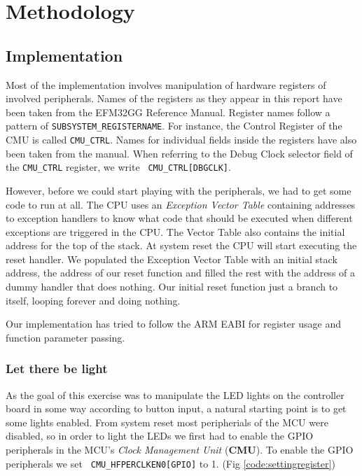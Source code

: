 \chapter{Methodology}

\section{Implementation}

Most of the implementation involves manipulation of hardware registers of
involved peripherals. Names of the registers as they appear in this report have
been taken from the EFM32GG Reference Manual. \cite{EFM32GGManual} Register names
follow a pattern of {\tt SUBSYSTEM\_REGISTERNAME}. For instance, the Control
Register of the CMU is called  {\tt CMU\_CTRL}. Names for individual fields
inside the registers have also been taken from the manual. When referring to the
Debug Clock selector field of the {\tt CMU\_CTRL} register, we write {\tt
CMU\_CTRL[DBGCLK]}.

However, before we could start playing with the peripherals, we had to get some
code to run at all. The CPU uses an \emph{Exception Vector Table} containing
addresses to exception handlers to know what code that should be executed when
different exceptions are triggered in the CPU. \cite{CortexM3Manual} The Vector
Table also contains the initial address for the top of the stack. At system
reset the CPU will start executing the reset handler. We populated the Exception
Vector Table with an initial stack address, the address of our reset function
and filled the rest with the address of a dummy handler that does nothing. Our
initial reset function just a branch to itself, looping forever and doing
nothing.

Our implementation has tried to follow the ARM EABI for register usage and
function parameter passing.

\subsection{Let there be light}

As the goal of this exercise was to manipulate the LED lights on the controller
board in some way according to button input, a natural starting point is to get
some lights enabled. From system reset most peripherials of the MCU were
disabled, so in order to light the LEDs we first had to enable the GPIO
peripherals in the MCU's \emph{Clock Management Unit} (\textbf{CMU}).
\cite{EFM32GGManual} To enable the GPIO peripherals we set {\tt
CMU\_HFPERCLKEN0[GPIO]} to 1. (Fig \ref{code:settingregister})

